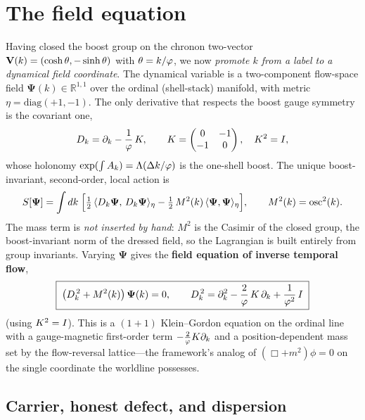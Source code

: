 \section{The field equation}\label{sec:fieldeq}

Having closed the boost group on the chronon two-vector $\mathbf{V}(k)=(\cosh\theta,-\sinh\theta)$ with $\theta=k/\varphi$, we now \emph{promote $k$ from a label to a dynamical field coordinate}. The dynamical variable is a two-component flow-space field $\boldsymbol\Psi(k)\in\mathbb{R}^{1,1}$ over the ordinal (shell-stack) manifold, with metric $\eta=\mathrm{diag}(+1,-1)$. The only derivative that respects the boost gauge symmetry is the covariant one,
\begin{equation}
D_k=\partial_k-\frac{1}{\varphi}\,K,\qquad
K=\begin{pmatrix}0&-1\\-1&0\end{pmatrix},\quad K^2=I,
\label{eq:fieldeq:Dk}
\end{equation}
whose holonomy $\exp(\int A_k)=\Lambda(\Delta k/\varphi)$ is the one-shell boost. The unique boost-invariant, second-order, local action is
\begin{equation}
S[\boldsymbol\Psi]=\int dk\;\Big[\tfrac12\,\langle D_k\boldsymbol\Psi,\,D_k\boldsymbol\Psi\rangle_\eta-\tfrac12\,M^2(k)\,\langle\boldsymbol\Psi,\boldsymbol\Psi\rangle_\eta\Big],\qquad M^2(k)=\operatorname{osc}^2(k).
\label{eq:fieldeq:action}
\end{equation}
The mass term is \emph{not inserted by hand}: $M^2$ is the Casimir of the closed group, the boost-invariant norm of the dressed field, so the Lagrangian is built entirely from group invariants. Varying $\boldsymbol\Psi$ gives the \textbf{field equation of inverse temporal flow},
\begin{equation}
\boxed{\;\big(D_k^{\,2}+M^2(k)\big)\,\boldsymbol\Psi(k)=0,\qquad
D_k^{\,2}=\partial_k^2-\frac{2}{\varphi}\,K\,\partial_k+\frac{1}{\varphi^2}\,I\;}
\label{eq:fieldeq:KG}
\end{equation}
(using $K^2=I$). This is a $(1{+}1)$ Klein--Gordon equation on the ordinal line with a gauge-magnetic first-order term $-\tfrac{2}{\varphi}K\partial_k$ and a position-dependent mass set by the flow-reversal lattice---the framework's analog of $(\Box+m^2)\phi=0$ on the single coordinate the worldline possesses.

\subsection{Carrier, honest defect, and dispersion}

